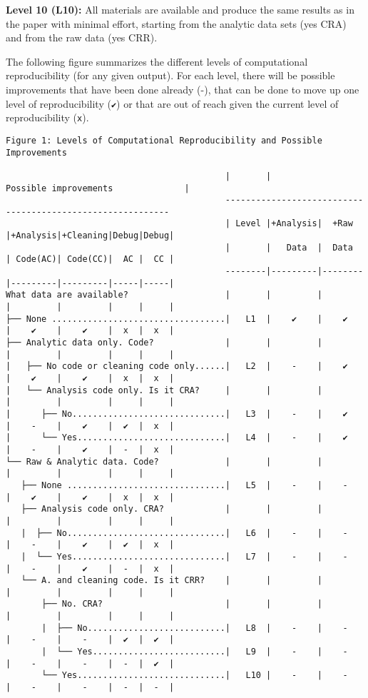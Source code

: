 \documentclass[]{book}
\begin{document}
\textbf{Level 10 (L10):} All materials are available and produce the same results as in the paper with minimal effort, starting from the analytic data sets (yes CRA) and from the raw data (yes CRR).

The following figure summarizes the different levels of computational reproducibility (for any given output). For each level, there will be possible improvements that have been done already (-), that can be done to move up one level of reproducibility (\texttt{✔}) or that are out of reach given the current level of reproducibility (\texttt{x}).

\begin{verbatim}
Figure 1: Levels of Computational Reproducibility and Possible Improvements   

                                           |       |               Possible improvements              |
                                           -----------------------------------------------------------
                                           | Level |+Analysis|  +Raw  |+Analysis|+Cleaning|Debug|Debug|
                                           |       |   Data  |  Data  | Code(AC)| Code(CC)|  AC |  CC |
                                           --------|---------|--------|---------|---------|-----|-----|
What data are available?                   |       |         |        |         |         |     |     |
├── None ..................................|   L1  |    ✔    |    ✔   |    ✔    |    ✔    |  x  |  x  |
├── Analytic data only. Code?              |       |         |        |         |         |     |     |
|   ├── No code or cleaning code only......|   L2  |    -    |    ✔   |    ✔    |    ✔    |  x  |  x  |
|   └── Analysis code only. Is it CRA?     |       |         |        |         |         |     |     |
|      ├── No..............................|   L3  |    -    |    ✔   |    -    |    ✔    |  ✔  |  x  |
|      └── Yes.............................|   L4  |    -    |    ✔   |    -    |    ✔    |  -  |  x  |
└── Raw & Analytic data. Code?             |       |         |        |         |         |     |     |
   ├── None ...............................|   L5  |    -    |    -   |    ✔    |    ✔    |  x  |  x  |
   ├── Analysis code only. CRA?            |       |         |        |         |         |     |     |
   |  ├── No...............................|   L6  |    -    |    -   |    -    |    ✔    |  ✔  |  x  |
   |  └── Yes..............................|   L7  |    -    |    -   |    -    |    ✔    |  -  |  x  |
   └── A. and cleaning code. Is it CRR?    |       |         |        |         |         |     |     |
       ├── No. CRA?                        |       |         |        |         |         |     |     |
       |  ├── No...........................|   L8  |    -    |    -   |    -    |    -    |  ✔  |  ✔  |
       |  └── Yes..........................|   L9  |    -    |    -   |    -    |    -    |  -  |  ✔  |
       └── Yes.............................|   L10 |    -    |    -   |    -    |    -    |  -  |  -  |
\end{verbatim}
\end{document}

